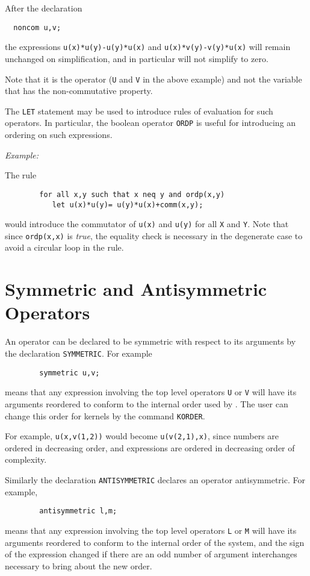 After the declaration
\begin{verbatim}
  noncom u,v;
\end{verbatim}
the expressions \texttt{u(x)*u(y)-u(y)*u(x)} and \texttt{u(x)*v(y)-v(y)*u(x)} 
will remain unchanged
on simplification, and in particular will not simplify to zero.

Note that it is the operator (\texttt{U} and \texttt{V} in the above example)
and not the variable that has the non-commutative property.

The \texttt{LET} statement may be used to introduce rules of
evaluation for such operators.  In particular, the boolean operator
\texttt{ORDP} is useful for introducing an ordering on such
expressions.

\textit{Example:}

The rule
\begin{verbatim}
        for all x,y such that x neq y and ordp(x,y)
           let u(x)*u(y)= u(y)*u(x)+comm(x,y);
\end{verbatim}
would introduce the commutator of \texttt{u(x)} and \texttt{u(y)} for all
\texttt{X} and \texttt{Y}.  Note that since \texttt{ordp(x,x)} is {\em true}, the
equality check is necessary in the degenerate case to avoid a circular
loop in the rule.

\hypertarget{reserved:SYMMETRIC}{\section{Symmetric and Antisymmetric Operators}}

An operator can be declared to be symmetric with respect to its arguments
by the declaration \texttt{SYMMETRIC}. For example
\begin{verbatim}
        symmetric u,v;
\end{verbatim}
means that any expression involving the top level operators \texttt{U} or
\texttt{V} will have its arguments reordered to conform to the internal order
used by {\REDUCE}.  The user can change this order for kernels by the
command \texttt{KORDER}.

For example, \texttt{u(x,v(1,2))} would become \texttt{u(v(2,1),x)}, since
numbers are ordered in decreasing order, and expressions are ordered in
decreasing order of complexity.

Similarly the declaration \texttt{ANTISYMMETRIC}
declares an operator antisymmetric.   For example,
\begin{verbatim}
        antisymmetric l,m;
\end{verbatim}
means that any expression involving the top level operators \texttt{L} or
\texttt{M} will have its arguments reordered to conform to the internal order
of the system, and the sign of the expression changed if there are an odd
number of argument interchanges necessary to bring about the new order.

